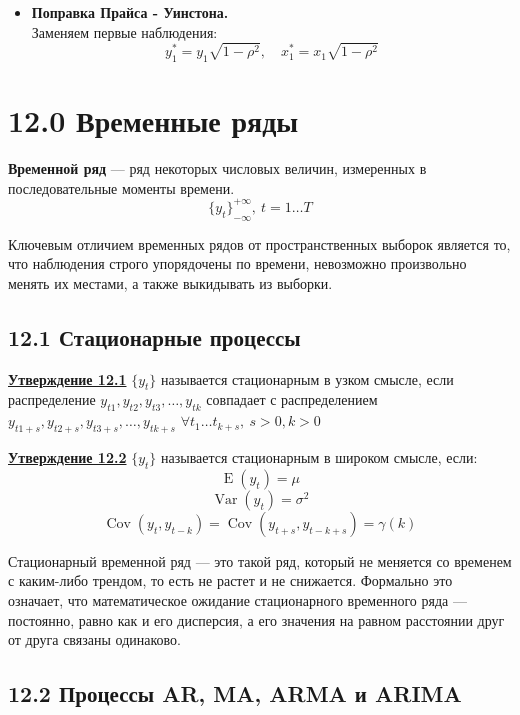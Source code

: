 \documentclass[a0,final]{a0poster}
\DeclareMathOperator{\Var}{Var}
\DeclareMathOperator{\Cov}{Cov}
\DeclareMathOperator{\E}{E}
\begin{document}
\begin{multicols}{4}
\begin{itemize}
\item \textbf{Поправка Прайса - Уинстона.} \\
Заменяем первые наблюдения:\\
\[y^*_1 = y_1\sqrt{1-\rho^2}, \quad x^*_1 = x_1\sqrt{1-\rho^2}\]


\end{itemize}
\section*{12.0 Временные ряды}
\begin{tcolorbox}[colback=red!5!white,colframe=red!75!black]
\textbf{Временной ряд} — ряд некоторых числовых величин, измеренных в последовательные моменты времени.
\[{\{y_t\}}^{+\infty}_{-\infty},\:t=1\dotsc T\]
\end{tcolorbox}
Ключевым отличием временных рядов от пространственных выборок является то, что наблюдения строго упорядочены по времени, невозможно произвольно менять их местами, а также выкидывать из выборки.

\subsection*{\textbf{12.1 Стационарные процессы}}
\begin{tcolorbox}[colback=blue!5!white,colframe=blue!75!black]
\textbf{\underline{Утверждение 12.1}} \textbf{$\{y_t\}$} называется стационарным в узком смысле, если распределение $y_{t1},y_{t2},y_{t3},\dotsc,y_{tk}$ совпадает с распределением $y_{t1+s},y_{t2+s},y_{t3+s},\dotsc,y_{tk+s}$ \: $\forall t_1\dotsc t_{k+s},\:s>0, k>0$
\end{tcolorbox}

\begin{tcolorbox}[colback=blue!5!white,colframe=blue!75!black]
\textbf{\underline{Утверждение 12.2}} \textbf{$\{y_t\}$} называется стационарным в широком смысле, если:
\[\E(y_t)=\mu\]
\[\Var(y_t)=\sigma^2\]
\[\Cov(y_t,y_{t-k})=\Cov(y_{t+s},y_{t-k+s})=\gamma(k)\]
\end{tcolorbox}

Стационарный временной ряд — это такой ряд, который не меняется со временем с каким-либо трендом, то есть не растет и не снижается. Формально это означает, что математическое ожидание стационарного временного ряда — постоянно, равно как и его дисперсия, а его значения на равном расстоянии друг от друга связаны одинаково.

\subsection*{\textbf{12.2 Процессы AR, MA, ARMA и ARIMA}}


\end{multicols}
\end{document}
